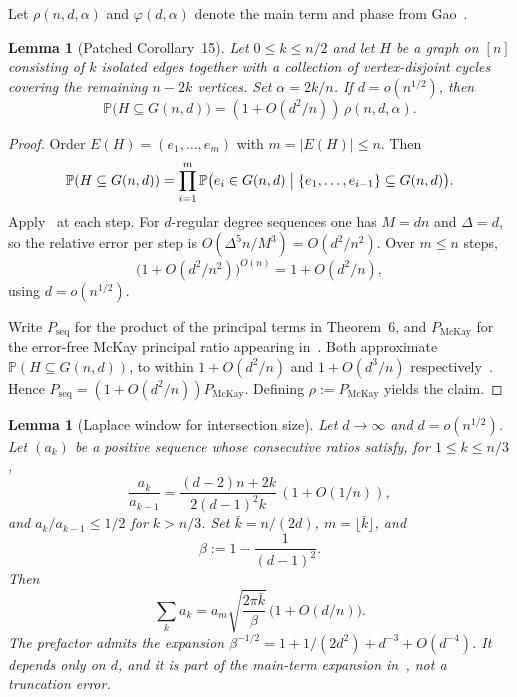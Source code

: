 \documentclass[11pt]{article}
\newtheorem{lemma}[theorem]{Lemma}
\newcommand{\Gnd}{G(n,d)}
\newcommand{\PP}{\mathbb{P}}
\begin{document}
Let \(\rho(n,d,\alpha)\) and \(\varphi(d,\alpha)\) denote the main term and phase from
Gao~\cite[Corollary~15]{Gao21}.

\begin{lemma}[Patched Corollary~15]
\label{lem:cor15}
Let \(0\le k\le n/2\) and let \(H\) be a graph on \([n]\) consisting of \(k\) isolated edges
together with a collection of vertex-disjoint cycles covering the remaining
\(n-2k\) vertices.
Set \(\alpha=2k/n\).
If \(d=o(n^{1/2})\), then
\[
\PP\bigl(H\subseteq\Gnd\bigr)=(1+O(d^2/n))\,\rho(n,d,\alpha).
\]
\end{lemma}

\begin{proof}
Order \(E(H)=(e_1,\ldots,e_m)\) with \(m=|E(H)|\le n\).
Then
\[
\PP(H\subseteq\Gnd)
=\prod_{i=1}^{m}
\PP\bigl(e_i\in\Gnd\bigm|\{e_1,\ldots,e_{i-1}\}\subseteq\Gnd\bigr).
\]
Apply~\cite[Theorem~6]{Gao20} at each step.
For \(d\)-regular degree sequences one has \(M=dn\) and \(\Delta=d\), so the relative
error per step is \(O(\Delta^5 n/M^3)=O(d^2/n^2)\).
Over \(m\le n\) steps,
\[
\bigl(1+O(d^2/n^2)\bigr)^{O(n)}=1+O(d^2/n),
\]
using \(d=o(n^{1/2})\).

Write \(P_{\mathrm{seq}}\) for the product of the principal terms in Theorem~6, and
\(P_{\mathrm{McKay}}\) for the error-free McKay principal ratio appearing
in~\cite[proof of Corollary~15]{Gao21}.
Both approximate \(\PP(H\subseteq\Gnd)\), to within \(1+O(d^2/n)\) and \(1+O(d^3/n)\)
respectively~\cite[Remark~8]{Gao20}.
Hence \(P_{\mathrm{seq}}=(1+O(d^2/n))P_{\mathrm{McKay}}\).
Defining \(\rho:=P_{\mathrm{McKay}}\) yields the claim.
\end{proof}

\begin{lemma}[Laplace window for intersection size]
\label{lem:laplace}
Let \(d\to\infty\) and \(d=o(n^{1/2})\). Let \((a_k)\) be a positive sequence whose
consecutive ratios satisfy, for \(1\le k\le n/3\),
\[
\frac{a_k}{a_{k-1}}
=
\frac{(d-2)n+2k}{2(d-1)^2 k}\,(1+O(1/n)),
\]
and \(a_k/a_{k-1}\le 1/2\) for \(k>n/3\). Set \(\bar k=n/(2d)\), \(m=\lfloor\bar k\rfloor\), and
\[
\beta
:=
1-\frac1{(d-1)^2}.
\]
Then
\[
\sum_k a_k
=
a_m\sqrt{\frac{2\pi\bar k}{\beta}}\,\bigl(1+O(d/n)\bigr).
\]
The prefactor admits the expansion
\(\beta^{-1/2}=1+1/(2d^2)+d^{-3}+O(d^{-4})\).
It depends only on \(d\), and it is part of the main-term expansion in~\cite[§3.4.1]{Gao21},
not a truncation error.
\end{lemma}
\end{document}

